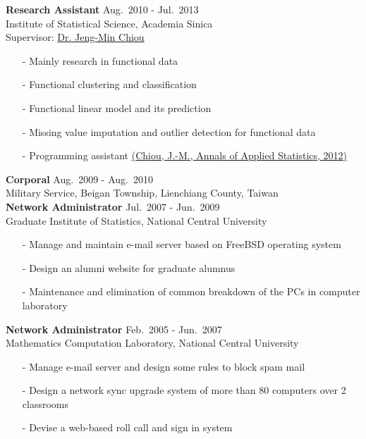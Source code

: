 \documentclass[a4paper,10pt,dvipdfmx]{article}
\begin{document}
\indent \textbf{Research Assistant} \hfill Aug.~2010 - Jul.~2013\\
\indent Institute of Statistical Science, Academia Sinica\\
\indent Supervisor: \href{http://www.stat.sinica.edu.tw/jmchiou/}{Dr. Jeng-Min Chiou}
\begin{itemize}[noitemsep,nolistsep,leftmargin=12mm]
  \item[-] Mainly research in functional data
  \item[-] Functional clustering and classification
  \item[-] Functional linear model and its prediction
  \item[-] Missing value imputation and outlier detection for functional data
  \item[-] Programming assistant \href{https://projecteuclid.org/euclid.aoas/1356629052/}{(Chiou, J.-M., Annals of Applied Statistics, 2012)}\\
\end{itemize}

\indent \textbf{Corporal} \hfill Aug.~2009 - Aug.~2010\\
\indent Military Service, Beigan Township, Lienchiang County, Taiwan\\

\indent \textbf{Network Administrator} \hfill Jul.~2007 - Jun.~2009\\
\indent Graduate Institute of Statistics, National Central University
\begin{itemize}[noitemsep,nolistsep,leftmargin=12mm]
  \item[-] Manage and maintain e-mail server based on FreeBSD operating system
  \item[-] Design an alumni website for graduate alumnus
  \item[-] Maintenance and elimination of common breakdown of the PCs in computer laboratory\\
\end{itemize}

\indent \textbf{Network Administrator} \hfill Feb.~2005 - Jun.~2007\\
\indent Mathematics Computation Laboratory, National Central University
\begin{itemize}[noitemsep,nolistsep,leftmargin=12mm]
  \item[-] Manage e-mail server and design some rules to block spam mail
  \item[-] Design a network sync upgrade system of more than 80 computers over 2 classrooms
  \item[-] Devise a web-based roll call and sign in system\\
\end{itemize}
\end{document}
